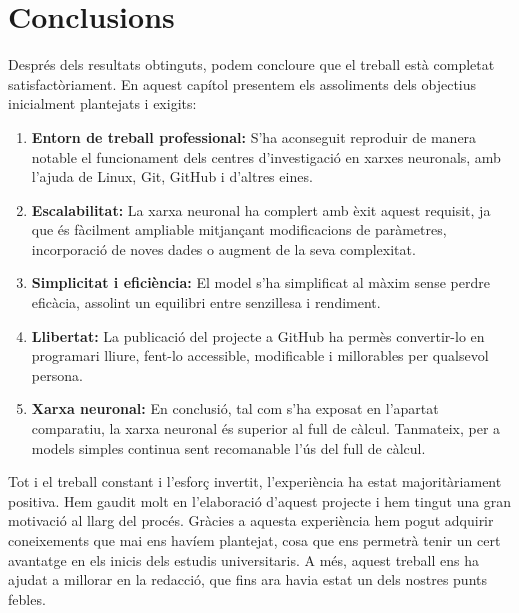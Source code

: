 \chapter{Conclusions}

\label{c:conclusions}

Després dels resultats obtinguts, podem concloure que el treball està completat satisfactòriament. En aquest capítol presentem els assoliments dels objectius inicialment plantejats i exigits:

\begin{enumerate}

     \item \textbf{Entorn de treball professional: } S’ha aconseguit reproduir de manera notable el funcionament dels centres d’investigació en xarxes neuronals, amb l'ajuda de Linux, Git, GitHub i d'altres eines.

     \item \textbf{Escalabilitat: } La xarxa neuronal ha complert amb èxit aquest requisit, ja que és fàcilment ampliable mitjançant modificacions de paràmetres, incorporació de noves dades o augment de la seva complexitat.

     \item \textbf{Simplicitat i eficiència: } El model s’ha simplificat al màxim sense perdre eficàcia, assolint un equilibri entre senzillesa i rendiment.

     \item \textbf{Llibertat: } La publicació del projecte a GitHub ha permès convertir-lo en programari lliure, fent-lo accessible, modificable i millorables per qualsevol persona.

     \item \textbf{Xarxa neuronal: } En conclusió, tal com s’ha exposat en l’apartat comparatiu, la xarxa neuronal és superior al full de càlcul. Tanmateix, per a models simples continua sent recomanable l’ús del full de càlcul.

\end{enumerate}

Tot i el treball constant i l’esforç invertit, l’experiència ha estat majoritàriament positiva. Hem gaudit molt en l’elaboració d’aquest projecte i hem tingut una gran motivació al llarg del procés. Gràcies a aquesta experiència hem pogut adquirir coneixements que mai ens havíem plantejat, cosa que ens permetrà tenir un cert avantatge en els inicis dels estudis universitaris. A més, aquest treball ens ha ajudat a millorar en la redacció, que fins ara havia estat un dels nostres punts febles.

